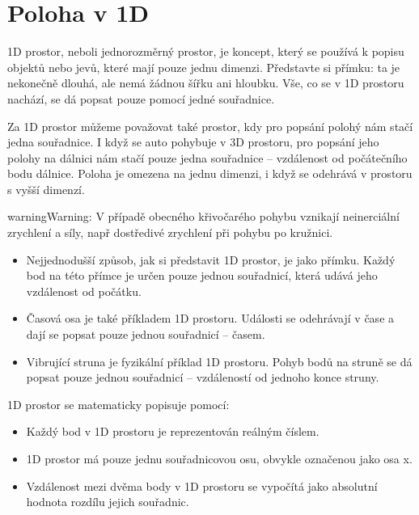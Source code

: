 \documentclass[letterpaper,10pt,english]{jupyterBook}
\begin{document}
\section{Poloha v 1D}
\label{\detokenize{Prednasky/1_2_Kinematika_v_1D:poloha-v-1d}}
\sphinxAtStartPar
1D prostor, neboli jednorozměrný prostor, je koncept, který se používá k popisu objektů nebo jevů, které mají pouze jednu dimenzi. Představte si přímku: ta je nekonečně dlouhá, ale nemá žádnou šířku ani hloubku. Vše, co se v 1D prostoru nachází, se dá popsat pouze pomocí jedné souřadnice.

\sphinxAtStartPar
Za 1D prostor můžeme považovat také prostor, kdy pro popsání polohý nám stačí jedna souřadnice. I když se auto pohybuje v 3D prostoru, pro popsání jeho polohy na dálnici nám stačí pouze jedna souřadnice – vzdálenost od počátečního bodu dálnice. Poloha je omezena na jednu dimenzi, i když se odehrává v prostoru s vyšší dimenzí.

\begin{sphinxadmonition}{warning}{Warning:}
\sphinxAtStartPar
V případě obecného křivočarého pohybu vznikají neinerciální zrychlení a síly, např dostředivé zrychlení při pohybu po kružnici.
\end{sphinxadmonition}

\sphinxAtStartPar
{}
\begin{itemize}
\item {} 
\sphinxAtStartPar
{} Nejjednodušší způsob, jak si představit 1D prostor, je jako přímku. Každý bod na této přímce je určen pouze jednou souřadnicí, která udává jeho vzdálenost od počátku.

\item {} 
\sphinxAtStartPar
{} Časová osa je také příkladem 1D prostoru. Události se odehrávají v čase a dají se popsat pouze jednou souřadnicí – časem.

\item {} 
\sphinxAtStartPar
{} Vibrující struna je fyzikální příklad 1D prostoru. Pohyb bodů na struně se dá popsat pouze jednou souřadnicí – vzdáleností od jednoho konce struny.

\end{itemize}

\sphinxAtStartPar
{}

\sphinxAtStartPar
1D prostor se matematicky popisuje pomocí:
\begin{itemize}
\item {} 
\sphinxAtStartPar
{} Každý bod v 1D prostoru je reprezentován reálným číslem.

\item {} 
\sphinxAtStartPar
{} 1D prostor má pouze jednu souřadnicovou osu, obvykle označenou jako osa x.

\item {} 
\sphinxAtStartPar
{} Vzdálenost mezi dvěma body v 1D prostoru se vypočítá jako absolutní hodnota rozdílu jejich souřadnic.

\end{itemize}
\end{document}
